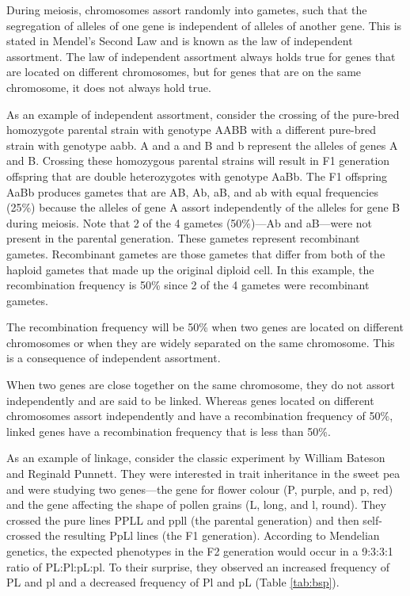 During meiosis, chromosomes assort randomly into gametes, such that the segregation of alleles of one gene is independent of alleles of another gene. This is stated in Mendel's Second Law and is known as the law of independent assortment. The law of independent assortment always holds true for genes that are located on different chromosomes, but for genes that are on the same chromosome, it does not always hold true.

As an example of independent assortment, consider the crossing of the pure-bred homozygote parental strain with genotype AABB with a different pure-bred strain with genotype aabb. A and a and B and b represent the alleles of genes A and B. Crossing these homozygous parental strains will result in F1 generation offspring that are double heterozygotes with genotype AaBb. The F1 offspring AaBb produces gametes that are AB, Ab, aB, and ab with equal frequencies (25\%) because the alleles of gene A assort independently of the alleles for gene B during meiosis. Note that 2 of the 4 gametes (50\%)---Ab and aB---were not present in the parental generation. These gametes represent recombinant gametes. Recombinant gametes are those gametes that differ from both of the haploid gametes that made up the original diploid cell. In this example, the recombination frequency is 50\% since 2 of the 4 gametes were recombinant gametes.

The recombination frequency will be 50\% when two genes are located on different chromosomes or when they are widely separated on the same chromosome. This is a consequence of independent assortment.

When two genes are close together on the same chromosome, they do not assort independently and are said to be linked. Whereas genes located on different chromosomes assort independently and have a recombination frequency of 50\%, linked genes have a recombination frequency that is less than 50\%.

As an example of linkage, consider the classic experiment by William Bateson and Reginald Punnett. They were interested in trait inheritance in the sweet pea and were studying two genes---the gene for flower colour (P, purple, and p, red) and the gene affecting the shape of pollen grains (L, long, and l, round). They crossed the pure lines PPLL and ppll (the parental generation) and then self-crossed the resulting PpLl lines (the F1 generation). According to Mendelian genetics, the expected phenotypes in the F2 generation would occur in a 9:3:3:1 ratio of PL:Pl:pL:pl. To their surprise, they observed an increased frequency of PL and pl and a decreased frequency of Pl and pL (Table \ref{tab:bsp}).

